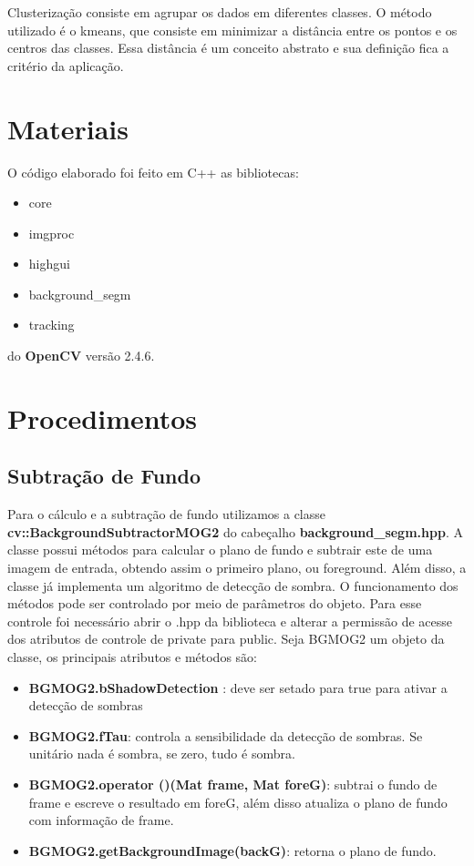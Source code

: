 \documentclass[journal]{IEEEtran}
\begin{document}
    Clusterização consiste em agrupar os dados em diferentes classes. 
O método utilizado é o kmeans, que consiste em minimizar a 
distância entre os pontos e os centros das classes. Essa distância é 
um conceito abstrato e sua definição fica a critério da aplicação.
  
  \newpage
\section{Materiais}
O código elaborado foi feito em C++ as bibliotecas:
\begin{itemize}
    \item core
    \item imgproc
    \item highgui
    \item background\_segm
    \item tracking
\end{itemize}
do \textbf{OpenCV} versão 2.4.6.


\section{Procedimentos}
\subsection{Subtração de Fundo}
Para o cálculo e a subtração de fundo utilizamos a 
classe \textbf{cv::BackgroundSubtractorMOG2} do cabeçalho
\textbf{background\_segm.hpp}. A classe possui métodos para calcular 
o plano de fundo e subtrair este de uma imagem de entrada, obtendo 
assim o primeiro plano, ou foreground. Além disso, a classe já 
implementa um algoritmo de detecção de sombra. O funcionamento dos 
métodos pode ser controlado por meio de parâmetros do objeto. Para 
esse controle foi necessário abrir o .hpp da biblioteca e alterar a 
permissão de acesse dos atributos de controle de private para public.
Seja BGMOG2 um objeto da classe, os principais atributos e métodos 
são:
\begin{itemize}
      \item \textbf{BGMOG2.bShadowDetection } :
      deve ser setado para true para ativar a detecção de sombras
      \item \textbf{BGMOG2.fTau}: controla a 
sensibilidade da detecção de sombras. Se unitário nada é sombra, se 
zero, tudo é sombra. 
      \item \textbf{BGMOG2.operator ()(Mat frame, Mat foreG)}: 
subtrai o fundo de frame e escreve o resultado em foreG, além disso 
atualiza o plano de fundo com informação de frame.
      \item \textbf{BGMOG2.getBackgroundImage(backG)}: retorna o 
plano de fundo.
\end{itemize}
\end{document}
